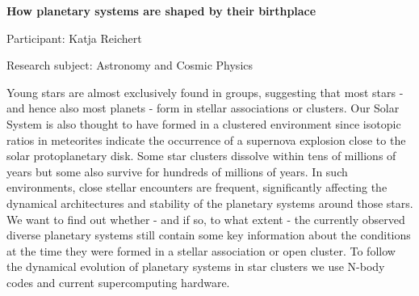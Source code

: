 \begin{minipage}[t]{1.0\textwidth}

\begin{center}

{{\large\bfseries How planetary systems are shaped by their birthplace}\par}

\end{center}

{\noindent Participant: Katja Reichert\par} 

{\noindent Research subject: Astronomy and Cosmic Physics\par}\medskip

\noindent Young stars are almost exclusively found in groups, suggesting that most stars - and hence also most planets - form in stellar associations or clusters. Our Solar System is also thought to have formed in a clustered environment since isotopic ratios in meteorites indicate the occurrence of a supernova explosion close to the solar protoplanetary disk. Some star clusters dissolve within tens of millions of years but some also survive for hundreds of millions of years. In such environments, close stellar encounters are frequent, significantly affecting the dynamical architectures and stability of the planetary systems around those stars. We want to find out whether - and if so, to what extent - the currently observed diverse planetary systems still contain some key information about the conditions at the time they were formed in a stellar association or open cluster. To follow the dynamical evolution of planetary systems in star clusters we use N-body codes and current supercomputing hardware.\par\end{minipage}

\hfill 

